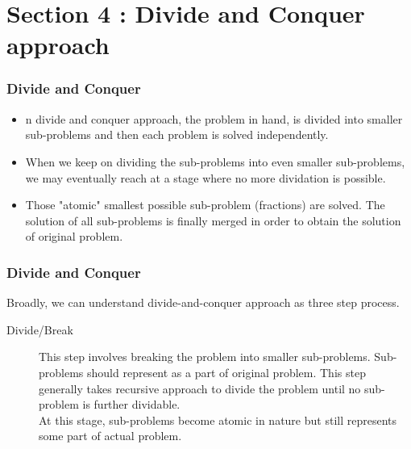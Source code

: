 \documentclass[algocomplexity.tex]{subfiles}
\begin{document}
\section{Section 4 : Divide and Conquer approach}
\begin{frame}
	\frametitle{Divide and Conquer}
	\large
	\begin{itemize}
		\item n divide and conquer approach, the problem in hand, is divided into smaller sub-problems and then each problem is solved independently. 
		\item When we keep on dividing the sub-problems into even smaller sub-problems, we may eventually reach at a stage where no more dividation is possible. 
		\item Those "atomic" smallest possible sub-problem (fractions) are solved. The solution of all sub-problems is finally merged in order to obtain the solution of original problem.
	\end{itemize}
\end{frame}
\begin{frame}
	\frametitle{Divide and Conquer}
	\large
	Broadly, we can understand divide-and-conquer approach as three step process.
	\begin{description}
		\item[Divide/Break] This step involves breaking the problem into smaller sub-problems. Sub-problems should represent as a part of original problem. This step generally takes recursive approach to divide the problem until no sub-problem is further dividable. \\ At this stage, sub-problems become atomic in nature but still represents some part of actual problem.
	\end{description}
	
	
\end{frame}
\end{document}
